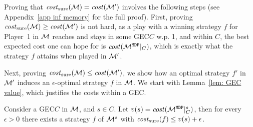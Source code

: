 \documentclass[runningheads,a4paper]{llncs}
\newcommand{\stam}[1]{}
\newcommand{\M}{{\cal M}}
\newcommand{\MDP}{{\mathtt{MDP}}}
\newcommand{\cost}{{\it cost}}
\newcommand{\costs}{{\it cost}_{\rm sure}}
\newcommand{\gec}{{GEC}\xspace}
\newcommand{\attr}{{\rm Attr}}
\newcommand{\env}{{\rm env}}
\begin{document}
\stam{
In order to find the maximal \gec of $\M$, we proceed as follows. 
\begin{enumerate}
\item Compute the maximal EC decomposition of $\M$.
\item For every maximal EC $C$, if $C$ is not good (i.e., the maximal parity rank in $C$ is odd), remove it from the graph $\attr_{\env}(C^{\max})$ and go to (1).
\item Once all the remaining components are good, return them.
\end{enumerate}
We remark that upon returning to step (1) from (2), it may be that the graph of $\M$ is not connected. Still, we find the decomposition in all the components.

We now turn to analyze the runtime of the algorithm.
First, computing the \gec of $\M$ can be done in polynomial time. Indeed, finding the maximal EC decomposition of $\M$ takes polynomial time (see \cite{CH14}
), and going over each component and checking that the maximal priority is even is clearly polynomial.
Next, finding the attractor takes polynomial, and removing the attractor can be done at most a polynomial number of times. 

The rest of the algorithm consists of adding a polynomial number of states with polynomial cost, and finding the value of an MDP, which by Theorem~\ref{thm:solving MDP in P} can be done in polynomial time.

Finally, we prove the correctness of the algorithm. 
We start with the following claim, which explains the correctness of our algorithm within \gec.
}

Proving that $\costs(\M)=\cost(\M')$ involves the following steps (see Appendix~\ref{app inf memory} for the full proof).
First, proving $\costs(\M)\ge \cost(\M')$ is not hard, as a play with a winning strategy $f$ for Player~1 in $\M$ reaches and stays in some \gec $C$ w.p. 1, and within $C$, the best expected cost one can hope for is $\cost(\M^{\MDP}|_C)$, which is exactly what the strategy $f$ attains when played in $\M'$.

Next, proving $\costs(\M)\le \cost(\M')$, we show how an optimal strategy $f'$ in $\M'$ induces an $\epsilon$-optimal strategy $f$ in $\M$. We start with Lemma~\ref{lem: GEC value}, 
which 
justifies the 
costs within a \gec.
\begin{lemma}
\label{lem: GEC value}
Consider a \gec $C$ in $\M$, and $s\in C$. Let $v(s)=\cost(\M^{\MDP}|^s_C)$, then for every $\epsilon>0$ there exists a strategy $f$ of
$\M^s$
 with $\costs(f)\le v(s)+\epsilon$. 
\end{lemma}
\end{document}
